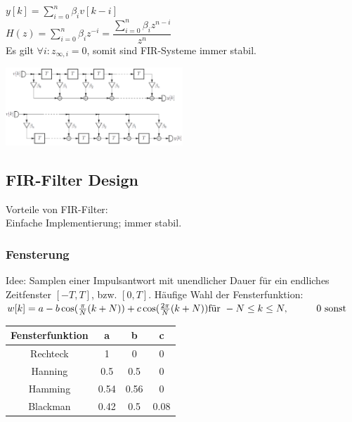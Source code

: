 \documentclass[a4paper,landscape,6pt]{article}
\begin{document}
\begin{multicols}{3}
$y[k] = \sum\limits_{i=0}^n \beta_i v[k-i]$\\
$H(z) = \sum\limits_{i=0}^n \beta_i z^{-i} = \dfrac{\sum_{i=0}^n \beta_i z^{n-i}}{z^n}$\\

Es gilt $\forall i: z_{\infty,i} = 0$, somit sind FIR-Systeme immer stabil.

\begin{minipage}[t]{0.6\textwidth}
	\includegraphics[width=0.5\textwidth]{images_ssp/FIR_Realisierung}\\
\end{minipage}
\subsection*{FIR-Filter Design}
Vorteile von FIR-Filter:\\Einfache Implementierung; immer stabil.
\subsubsection*{Fensterung}
Idee: Samplen einer Impulsantwort mit unendlicher Dauer für ein endliches Zeitfenster $[-T,T]$, bzw. $[0,T]$.
Häufige Wahl der Fensterfunktion:\\

$w[k] = a - b \cos(\frac{\pi}{N}(k+N)) + c \cos(\frac{2\pi}{N}(k+N)) \\ \text{für } -N \le k \le N, \hspace*{1cm} 0 \text{ sonst}$\\

\begin{tabular}{|c|c|c|c|}
	\hline
	 Fensterfunktion & a & b & c \\
	\hline
	Rechteck & 1 & 0 & 0 \\
	\hline
	Hanning & 0.5 & 0.5 & 0 \\
	\hline
	Hamming & 0.54 & 0.56 & 0 \\
	\hline
	Blackman & 0.42 & 0.5 & 0.08 \\
	\hline
\end{tabular}
\\


\end{multicols}
\end{document}
